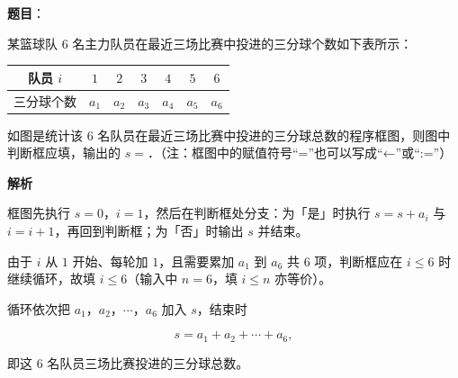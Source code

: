 \begin{answer}

\textbf{题目}：

某篮球队 $6$ 名主力队员在最近三场比赛中投进的三分球个数如下表所示：

\begin{center}
\begin{tabular}{ccccccc}
\toprule
队员 $i$ & $1$ & $2$ & $3$ & $4$ & $5$ & $6$ \\
\midrule
三分球个数 & $a_1$ & $a_2$ & $a_3$ & $a_4$ & $a_5$ & $a_6$ \\
\bottomrule
\end{tabular}
\end{center}

如图是统计该 $6$ 名队员在最近三场比赛中投进的三分球总数的程序框图，则图中判断框应填\gkblank{}，输出的 $s=$\gkblank{}．（注：框图中的赋值符号“=”也可以写成“←”或“:=”）
\nopagebreak[4]
\begin{center}\end{center}
\nopagebreak[4]
\textbf{解析}

框图先执行 $s=0$，$i=1$，然后在判断框处分支：为「是」时执行 $s=s+a_i$ 与 $i=i+1$，再回到判断框；为「否」时输出 $s$ 并结束。

由于 $i$ 从 $1$ 开始、每轮加 $1$，且需要累加 $a_1$ 到 $a_6$ 共 $6$ 项，判断框应在 $i\leqslant6$ 时继续循环，故填 $i\leqslant6$（输入中 $n=6$，填 $i\leqslant n$ 亦等价）。

循环依次把 $a_1$，$a_2$，$\cdots$，$a_6$ 加入 $s$，结束时

\nopagebreak[4]
\[s=a_1+a_2+\cdots+a_6,\]

即这 $6$ 名队员三场比赛投进的三分球总数。


\end{answer}
